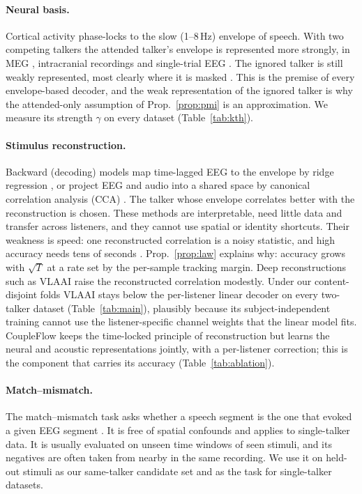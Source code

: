 \documentclass[10pt,twocolumn,letterpaper]{article}
\begin{document}
\paragraph{Neural basis.} Cortical activity phase-locks to the slow (1--8\,Hz) envelope of
speech. With two competing talkers the attended talker's envelope is represented more
strongly, in MEG \citep{ding2012emergence}, intracranial recordings
\citep{mesgarani2012selective} and single-trial EEG \citep{osullivan2015attentional}. The
ignored talker is still weakly represented, most clearly where it is masked
\citep{brodbeck2020neural}. This is the premise of every envelope-based decoder, and the
weak representation of the ignored talker is why the attended-only assumption of
Prop.~\ref{prop:pmi} is an approximation. We measure its strength $\gamma$ on every
dataset (Table~\ref{tab:kth}).

\paragraph{Stimulus reconstruction.} Backward (decoding) models map time-lagged EEG to the
envelope by ridge regression \citep{osullivan2015attentional,crosse2016mtrf}, or project
EEG and audio into a shared space by canonical correlation analysis (CCA)
\citep{decheveigne2018decoding}. The talker whose envelope correlates better with the
reconstruction is chosen. These methods are interpretable, need little data and transfer
across listeners, and they cannot use spatial or identity shortcuts. Their weakness is
speed: one reconstructed correlation is a noisy statistic, and high accuracy needs tens of
seconds \citep{geirnaert2021eeg}. Prop.~\ref{prop:law} explains why: accuracy grows with
$\sqrt T$ at a rate set by the per-sample tracking margin. Deep reconstructions such as
VLAAI \citep{accou2023vlaai} raise the reconstructed correlation modestly. Under our
content-disjoint folds VLAAI stays below the per-listener linear decoder on every
two-talker dataset (Table~\ref{tab:main}), plausibly because its subject-independent
training cannot use the listener-specific channel weights that the linear model fits.
CoupleFlow keeps the time-locked principle of reconstruction but learns the neural and
acoustic representations jointly, with a per-listener correction; this is the component
that carries its accuracy (Table~\ref{tab:ablation}).

\paragraph{Match--mismatch.} The match--mismatch task asks whether a speech segment is
the one that evoked a given EEG segment \citep{accou2021dilated,puffay2023relating}. It is
free of spatial confounds and applies to single-talker data. It is usually evaluated on
unseen time windows of seen stimuli, and its negatives are often taken from nearby in the
same recording. We use it on held-out stimuli as our same-talker candidate set and as the
task for single-talker datasets.
\end{document}
